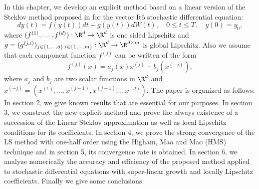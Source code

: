 In this chapter, we develop an explicit method based on a linear version  of the Steklov method proposed 
in  \cite{Diaz-Infante2015}  for the  vector It\^o stochastic differential equation:
\begin{equation}\label{eqn:SDE1}
	dy(t)
	 =f(y(t))dt + g(y(t))dW(t), \quad 0\leq t\leq T,
	\quad y(0)=y_0,
\end{equation}
where $(f^{(1)},\dots, f^{(d)}):\R^d \to \R^d$ is one sided Lipschitz and 
$g = (g^{(j,i)})_{j\in \{1,\dots,d\}, i\in\{1,\dots, m\}}:\R^d \to \R^{d\times m}$ is global Lipschitz. 
Also we assume 
that  each component function $f^{(j)}$  can be written of the form
\begin{equation}\label{eqn:AlternativeConstruction}
	f^{(j)}(x) = a_j(x) x^{(j)} + b_j (x^{(-j)}), 
\end{equation}
where $a_j$ and	$b_{j}$ are two scalar 	functions in  $\R^d$ 
and $x^{(-j)} = \left( x^{(1)},\dots,x^{(j-1)},x^{(j+1)},\dots x^{(d)}\right)$. 
The paper is organized as follows: In section 2, we give known results that are essential
for our purposes. In section 3, we construct the new explicit method and prove  
the always existence of a succession of the Linear Steklov  approximation as well as 
local Lipschitz conditions for its coefficients.  
In section 4, we prove the strong convergence of the LS method 
with one-half order using the Higham, Mao and 
Mao (HMS) technique and in section 5, its  convergence rate is obtained. 
In section 6, we analyze numerically  the accuracy and efficiency of the proposed method 
applied to stochastic  differential equations with super-linear growth and locally Lipschitz coefficients. 
Finally we give some conclusions.

